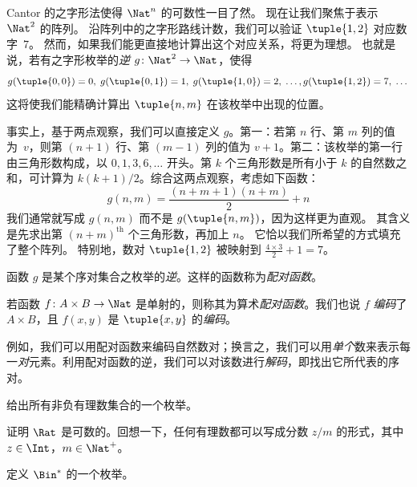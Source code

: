 \documentclass[../../../include/open-logic-section]{subfiles}
\begin{document}

\begin{explain}
Cantor 的之字形法使得 $\Nat^n$ 的可数性一目了然。
现在让我们聚焦于表示 $\Nat^2$ 的阵列。
沿阵列中的之字形路线计数，我们可以验证 $\tuple{1,2}$ 对应数字~$7$。
然而，如果我们能更直接地计算出这个对应关系，将更为理想。
也就是说，若有之字形枚举的\emph{逆} $g\colon \Nat^2 \to \Nat$，使得
\[
g(\tuple{0,0}) = 0, \;
g(\tuple{0,1}) = 1, \;
g(\tuple{1,0}) = 2, \; \dots,
g(\tuple{1,2}) = 7, \; \dots
\]
这将使我们能精确计算出 $\tuple{n, m}$ 在该枚举中出现的位置。

事实上，基于两点观察，我们可以直接定义 $g$。第一：若第 $n$ 行、第 $m$ 列的值为~$v$，则第 $(n+1)$ 行、第 $(m-1)$ 列的值为 $v + 1$。第二：该枚举的第一行由三角形数构成，以 $0, 1, 3, 6, \dots$ 开头。第 $k$ 个三角形数是所有小于 $k$ 的自然数之和，可计算为 $k(k+1)/2$。综合这两点观察，考虑如下函数：
\[
  g(n,m) = \frac{(n+m+1)(n+m)}{2} + n
\]
我们通常就写成 $g(n, m)$ 而不是 $g(\tuple{n, m})$，因为这样更为直观。
其含义是先求出第 $(n+m)^{\text{th}}$ 个三角形数，再加上 $n$。
它恰以我们所希望的方式填充了整个阵列。
特别地，数对 $\tuple{1, 2}$ 被映射到 $\frac{4 \times 3}{2} +
1 = 7$。

函数 $g$ 是某个序对集合之枚举的\emph{逆}。这样的函数称为\emph{配对函数}。
\end{explain}

\begin{defn}[配对函数]
  若函数 $f\colon A \times B \to \Nat$ 是单射的，则称其为算术\emph{配对函数}。我们也说 $f$ \emph{编码}了 $A \times B$，且 $f(x,y)$ 是 $\tuple{x,y}$ 的\emph{编码}。
\end{defn}

\begin{explain}
例如，我们可以用配对函数来编码自然数对；换言之，我们可以用\emph{单个}数来表示每一\emph{对}元素。利用配对函数的逆，我们可以对该数进行\emph{解码}，即找出它所代表的序对。
\end{explain}

\begin{prob}
给出所有非负有理数集合的一个枚举。
\end{prob}

\begin{prob}
证明 $\Rat$ 是可数的。回想一下，任何有理数都可以写成分数 $z/m$ 的形式，其中 $z \in \Int$，$m \in \Nat^+$。
\end{prob}

\begin{prob}
定义 $\Bin^*$ 的一个枚举。
\end{prob}
\end{document}
